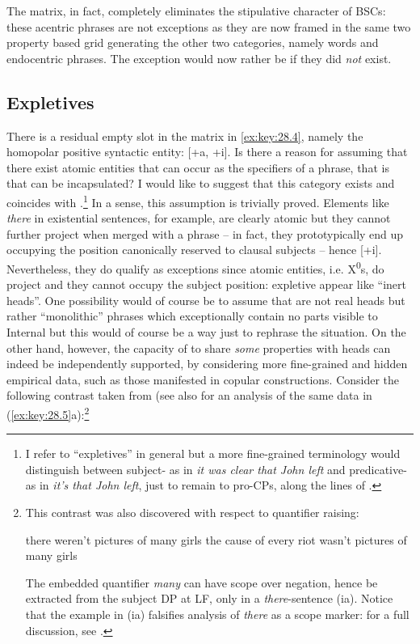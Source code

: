 \documentclass[output=paper]{langsci/langscibook}
\begin{document}
The matrix, in fact, completely eliminates the stipulative character of \glspl{BSC}:
these acentric phrases are not exceptions as they are now framed in the same
two property based grid generating the other two categories, namely words and
endocentric phrases. The exception would now rather be if they did \emph{not}
exist.

\subsection{Expletives}

There is a residual empty slot in the matrix in \eqref{ex:key:28.4}, namely the
homopolar positive syntactic entity: [+a, +i]. Is there a reason for assuming
that there exist atomic entities that can occur as the specifiers of a phrase,
that is that can be incapsulated? I would like to suggest that this category
exists and coincides with .\footnote{I refer to “expletives” in
    general but a more fine-grained terminology would distinguish between
    subject- as in \emph{it was clear that John left} and
    predicative- as in \emph{it's that John left}, just to remain to
    pro-CPs, along the lines of \citet{Moro1997}.} In a sense, this assumption
    is trivially proved. Elements like \emph{there} in  existential
    sentences, for example, are clearly atomic but they cannot further project
    when merged with a phrase -- in fact, they  prototypically end up occupying
    the position canonically reserved to clausal subjects -- hence [+i].
    Nevertheless, they do qualify as exceptions since atomic entities, i.e.
    X\textsuperscript{0}s, do project and they cannot occupy the subject
    position: expletive appear like “inert heads”. One possibility would of
    course be to assume that  are not real heads but rather
    “monolithic” phrases which exceptionally contain no parts visible to
    Internal  but this would of course be a way just to rephrase the
    situation.  On the other hand, however, the capacity of  to share
    \emph{some} properties with heads can indeed be independently supported, by
    considering more fine-grained and hidden empirical data, such as those
    manifested in copular constructions.  Consider the following contrast taken
    from \citealt{Moro1997} (see also \citealt{Stepanov2007} for an analysis of
    the same data in (\ref{ex:key:28.5}a):\footnote{This contrast was also
        discovered with respect to quantifier raising:

\begin{exe}
    \begin{xlist}
    \ex there weren't pictures of many girls
	\ex the cause of every riot wasn't pictures of many girls
    \end{xlist}
\end{exe}

The embedded quantifier \emph{many} can have scope over negation, hence be
extracted from the subject DP at \gls{LF}, only in a \emph{there}-sentence (ia).
Notice that the example in (ia) falsifies  analysis of
\emph{there} as a scope marker: for a full discussion, see \citet[Ch.\
2]{Moro1997}.}
\end{document}
